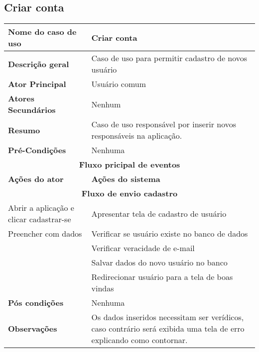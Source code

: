 \subsection{Criar conta}
\begin{center}
\begin{tabular}{ |p{7cm}|p{7cm}| } 
 \hline
 \textbf {Nome do caso de uso} & Criar conta\\
 \hline
 \textbf{Descrição geral} & Caso de uso para permitir cadastro de novos usuário \\
 \hline
 \textbf{Ator Principal} & Usuário comum \\ 
 \hline
 \textbf{Atores Secundários} & Nenhum \\
 \hline
 \textbf{Resumo} & Caso de uso responsável por inserir novos responsáveis na aplicação. \\
 \hline
 \textbf{Pré-Condições} & Nenhuma \\
 \hline 
 \multicolumn{2}{|c|}{\textbf{Fluxo pricipal de eventos} } \\
 \hline
 \textbf{Ações do ator} & \textbf{Ações do sistema} \\
 \hline
 \multicolumn{2}{|c|}{\textbf{Fluxo de envio cadastro} } \\
 \hline 
 Abrir a aplicação e clicar cadastrar-se & Apresentar tela de cadastro de usuário \\
 \hline
  Preencher com dados & Verificar se usuário existe no banco de dados\\
 \hline
 & Verificar veracidade de e-mail\\
 \hline
 & Salvar dados do novo usuário no banco \\
 \hline
 & Redirecionar usuário para a tela de boas vindas \\
 \hline
 \textbf{Pós condições} & Nenhuma \\
 \hline
 \textbf{Observações} & Os dados inseridos necessitam ser verídicos, caso contrário será exibida uma tela de erro explicando como contornar.\\
 \hline
\end{tabular}
\end{center}
